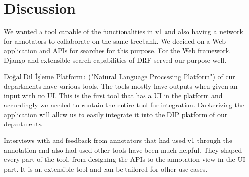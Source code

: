 \section{Discussion}
\label{sec:discussion}

We wanted a tool capable of the functionalities in \boat{} v1 and also having a network for annotators to collaborate on the same treebank.
We decided on a Web application and APIs for searches for this purpose.
For the Web framework, Django and extensible search capabilities of DRF served our purpose well.

Doğal Dil İşleme Platformu ("Natural Language Processing Platform") of our departments have various tools.
The tools mostly have outputs when given an input with no UI.
This is the first tool that has a UI in the platform and accordingly we needed to contain the entire tool for integration.
Dockerizing the application will allow us to easily integrate it into the DIP platform of our departments.\cite{DIP}

Interviews with and feedback from annotators that had used \boat{} v1 through the \bountreebank{} annotation and also had used other tools have been much helpful.
They shaped every part of the tool, from designing the APIs to the annotation view in the UI part.
It is an extensible tool and can be tailored for other use cases.
